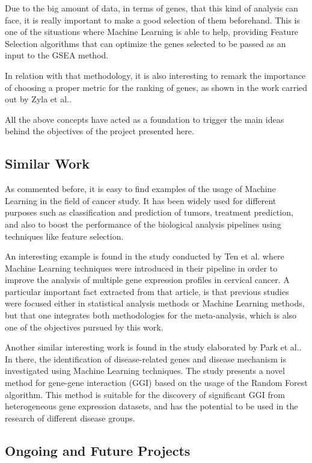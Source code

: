 Due to the big amount of data, in terms of genes, that this kind of analysis can face, it is really important to make a good selection of them beforehand. This is one of the situations where Machine Learning is able to help, providing Feature Selection algorithms that can optimize the genes selected to be passed as an input to the GSEA method.

In relation with that methodology, it is also interesting to remark the importance of choosing a proper metric for the ranking of genes, as shown in the work carried out by Zyla et al.\cite{Zyla2017}.

All the above concepts have acted as a foundation to trigger the main ideas behind the objectives of the project presented here.

\subsection{Similar Work}

As commented before, it is easy to find examples of the usage of Machine Learning in the field of cancer study. It has been widely used for different purposes such as classification\cite{Chuang2007} and prediction of tumors, treatment prediction, and also to boost the performance of the biological analysis pipelines using techniques like feature selection\cite{SINGH201552}\cite{Bashiri2017}.

An interesting example is found in the study conducted by Ten et al.\cite{Tan2018} where Machine Learning techniques were introduced in their pipeline in order to improve the analysis of multiple gene expression profiles in cervical cancer.
A particular important fact extracted from that article, is that previous studies were focused either in statistical analysis methods or Machine Learning methods, but that one integrates both methodologies for the meta-analysis, which is also one of the objectives pursued by this work.

Another similar interesting work is found in the study elaborated by Park et al.\cite{Park2018}. In there, the identification of disease-related genes and disease mechanism is investigated using Machine Learning techniques. The study presents a novel method for gene-gene interaction (GGI) based on the usage of the Random Forest algorithm. This method is suitable for the discovery of significant GGI from heterogeneous gene expression datasets, and has the potential to be used in the research of different disease groups.

\subsection{Ongoing and Future Projects}


